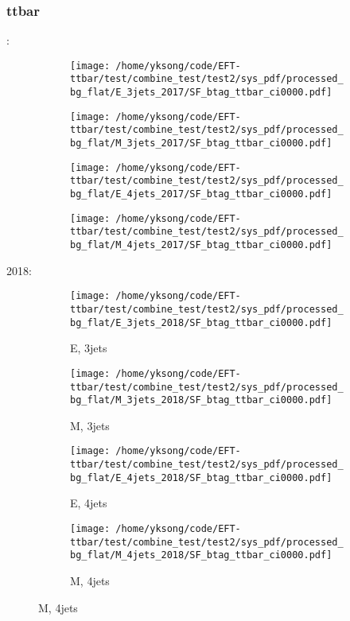 \documentclass{beamer}
\begin{document}
\begin{frame}
\frametitle{ttbar}
\fontsize{5}{1}:
\begin{figure}
\centering
\begin{subfigure}[b]{0.24\textwidth}
\texttt{[image: /home/yksong/code/EFT-ttbar/test/combine\_test/test2/sys\_pdf/processed\_bg\_flat/E\_3jets\_2017/SF\_btag\_ttbar\_ci0000.pdf]}
\end{subfigure}
\begin{subfigure}[b]{0.24\textwidth}
\texttt{[image: /home/yksong/code/EFT-ttbar/test/combine\_test/test2/sys\_pdf/processed\_bg\_flat/M\_3jets\_2017/SF\_btag\_ttbar\_ci0000.pdf]}
\end{subfigure}
\begin{subfigure}[b]{0.24\textwidth}
\texttt{[image: /home/yksong/code/EFT-ttbar/test/combine\_test/test2/sys\_pdf/processed\_bg\_flat/E\_4jets\_2017/SF\_btag\_ttbar\_ci0000.pdf]}
\end{subfigure}
\begin{subfigure}[b]{0.24\textwidth}
\texttt{[image: /home/yksong/code/EFT-ttbar/test/combine\_test/test2/sys\_pdf/processed\_bg\_flat/M\_4jets\_2017/SF\_btag\_ttbar\_ci0000.pdf]}
\end{subfigure}
\end{figure}
2018:
\begin{figure}
\centering
\begin{subfigure}[b]{0.24\textwidth}
\texttt{[image: /home/yksong/code/EFT-ttbar/test/combine\_test/test2/sys\_pdf/processed\_bg\_flat/E\_3jets\_2018/SF\_btag\_ttbar\_ci0000.pdf]}
\captionsetup{font=tiny}
\caption{E, 3jets}
\end{subfigure}
\begin{subfigure}[b]{0.24\textwidth}
\texttt{[image: /home/yksong/code/EFT-ttbar/test/combine\_test/test2/sys\_pdf/processed\_bg\_flat/M\_3jets\_2018/SF\_btag\_ttbar\_ci0000.pdf]}
\captionsetup{font=tiny}
\caption{M, 3jets}
\end{subfigure}
\begin{subfigure}[b]{0.24\textwidth}
\texttt{[image: /home/yksong/code/EFT-ttbar/test/combine\_test/test2/sys\_pdf/processed\_bg\_flat/E\_4jets\_2018/SF\_btag\_ttbar\_ci0000.pdf]}
\captionsetup{font=tiny}
\caption{E, 4jets}
\end{subfigure}
\begin{subfigure}[b]{0.24\textwidth}
\texttt{[image: /home/yksong/code/EFT-ttbar/test/combine\_test/test2/sys\_pdf/processed\_bg\_flat/M\_4jets\_2018/SF\_btag\_ttbar\_ci0000.pdf]}
\captionsetup{font=tiny}
\caption{M, 4jets}
\end{subfigure}
\end{figure}
\end{frame}
\end{document}
